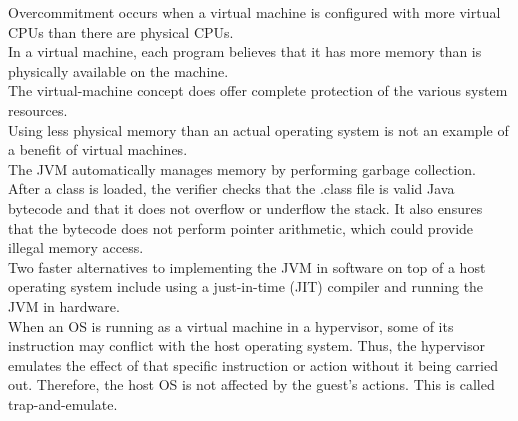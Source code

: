 \documentclass[12pt]{article}
\begin{document}
Overcommitment occurs when a virtual machine is configured with more virtual CPUs than there are physical CPUs.\\[2mm]
In a virtual machine, each program believes that it has more memory than is physically available on the machine.\\[2mm]
The virtual-machine concept does offer complete protection of the various system resources.\\[2mm]
Using less physical memory than an actual operating system is not an example of a benefit of virtual machines.\\[2mm]
The JVM automatically manages memory by performing garbage collection. After a class is loaded, the verifier checks that the .class file is valid Java bytecode and that it does not overflow or underflow the stack. It also ensures that the bytecode does not perform pointer arithmetic, which could provide illegal memory access.\\[2mm]
Two faster alternatives to implementing the JVM in software on top of a host operating system include using a just-in-time (JIT) compiler and running the JVM in hardware.\\[2mm]
When an OS is running as a virtual machine in a hypervisor, some of its instruction may conflict with the host operating system. Thus, the hypervisor emulates the effect of that specific instruction or action without it being carried out. Therefore, the host OS is not affected by the guest's actions. This is called trap-and-emulate.\\[2mm]
\newpage
\end{document}
